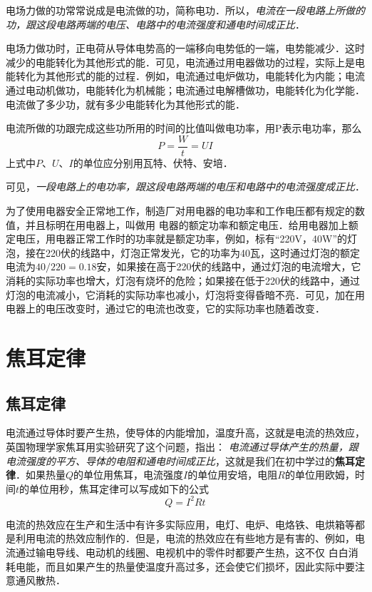 电场力做的功常常说成是电流做的功，简称电功．所以，\textit{电流在一段电路上所做的功，跟这段电路两端的电压、电路中的电流强度和通电时间成正比}．

电场力做功时，正电荷从导体电势高的一端移向电势低的一端，电势能减少．这时减少的电能转化为其他形式的能．可见，电流通过用电器做功的过程，实际上是电能转化为其他形式的能的过程．例如，电流通过电炉做功，电能转化为内能；电流通过电动机做功，电能转化为机械能；电流通过电解槽做功，电能转化为化学能．电流做了多少功，就有多少电能转化为其他形式的能．

电流所做的功跟完成这些功所用的时间的比值叫做电功率，用P表示电功率，那么
\[P=\frac{W}{t}=UI\]
上式中$P$、$U$、$I$的单位应分别用瓦特、伏特、安培．

可见，\textit{一段电路上的电功率，跟这段电路两端的电压和电路中的电流强度成正比}．

为了使用电器安全正常地工作，制造厂对用电器的电功率和工作电压都有规定的数值，并且标明在用电器上，叫做用
电器的额定功率和额定电压．给用电器加上额定电压，用电器正常工作时的功率就是额定功率，例如，标有“220V，40W”的灯泡，接在220伏的线路中，灯泡正常发光，它的功率为40瓦，这时通过灯泡的额定电流为$40/220=0.18$安，如果接在高于220伏的线路中，通过灯泡的电流增大，它消耗的实际功率也增大，灯泡有烧坏的危险；如果接在低于220伏的线路中，通过灯泡的电流减小，它消耗的实际功率也减小，灯泡将变得昏暗不亮．可见，加在用电器上的电压改变时，通过它的电流也改变，它的实际功率也随着改变．

\section{焦耳定律}
\subsection{焦耳定律}


电流通过导体时要产生热，使导体的内能增加，温度升高，这就是电流的热效应，英国物理学家焦耳用实验研究了这个问题，指出：
\textit{电流通过导体产生的热量，跟电流强度的平方、导体的电阻和通电时间成正比}，这就是我们在初中学过的\textbf{焦耳定律}．如果热量$Q$的单位用焦耳，电流强度$I$的单位用安培，电阻$R$的单位用欧姆，时间$t$的单位用秒，焦耳定律可以写成如下的公式
\[Q=I^2Rt\]

电流的热效应在生产和生活中有许多实际应用，电灯、电炉、电烙铁、电烘箱等都是利用电流的热效应制作的．但是，电流的热效应在有些地方是有害的、例如，电流通过输电导线、电动机的线圈、电视机中的零件时都要产生热，这不仅
白白消耗电能，而且如果产生的热量使温度升高过多，还会使它们损坏，因此实际中要注意通风散热．

